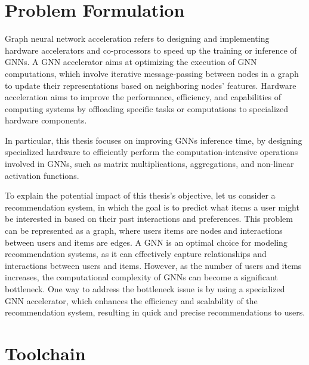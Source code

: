 \documentclass[11pt,a4paper,twocolumn]{article}
\begin{document}
\newpage
\section{Problem Formulation}
\label{sec:problem-formulation}%

Graph neural network acceleration refers to designing and implementing hardware accelerators and co-processors to speed up the training or inference of GNNs.
A GNN accelerator aims at optimizing the execution of GNN computations, which involve iterative message-passing between nodes in a graph to update their representations based on neighboring nodes' features.
Hardware acceleration aims to improve the performance, efficiency, and capabilities of computing systems by offloading specific tasks or computations to specialized hardware components.

In particular, this thesis focuses on improving GNNs inference time, by designing specialized hardware to efficiently perform the computation-intensive operations involved in GNNs, such as matrix multiplications, aggregations, and non-linear activation functions.

To explain the potential impact of this thesis's objective, let us consider a recommendation system, in which the goal is to predict what items a user might be interested in based on their past interactions and preferences.
This problem can be represented as a graph, where users items are nodes and interactions between users and items are edges.
A GNN is an optimal choice for modeling recommendation systems, as it can effectively capture relationships and interactions between users and items.
However, as the number of users and items increases, the computational complexity of GNNs can become a significant bottleneck.
One way to address the bottleneck issue is by using a specialized GNN accelerator, which enhances the efficiency and scalability of the recommendation system, resulting in quick and precise recommendations to users.


\section{Toolchain}
\label{sec:toolchain}%
\end{document}

